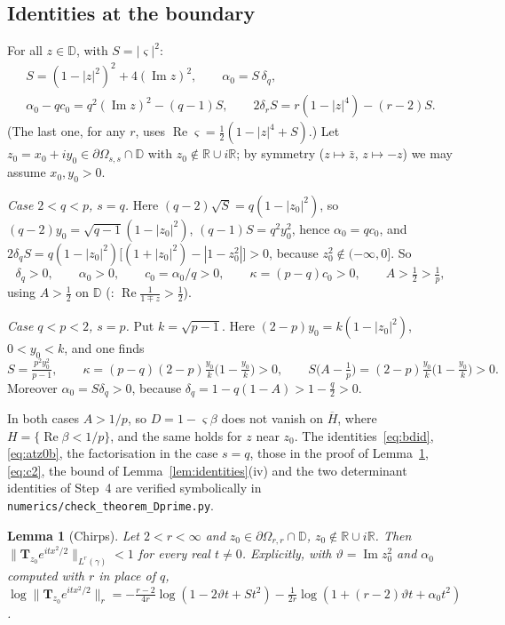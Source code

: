 \documentclass[11pt]{amsart}
\newtheorem{lemma}[theorem]{Lemma}
\theoremstyle{definition}
\newcommand{\R}{\mathbb{R}}
\newcommand{\Rea}{\operatorname{Re}}
\newcommand{\Ima}{\operatorname{Im}}
\newcommand{\bT}{\mathbf{T}}
\newcommand{\D}{\mathbb{D}}
\begin{document}
\subsection{Identities at the boundary}
For all $z\in\D$, with $S=|\varsigma|^2$:
\begin{equation}\label{eq:bdid}
\begin{gathered}
S=(1-|z|^2)^2+4(\Ima z)^2,\qquad \alpha_0=S\,\delta_q,\\
\alpha_0-qc_0=q^2(\Ima z)^2-(q-1)S,\qquad 2\delta_rS=r(1-|z|^4)-(r-2)S .
\end{gathered}
\end{equation}
(The last one, for any $r$, uses $\Rea\varsigma=\frac12(1-|z|^4+S)$.) Let $z_0=x_0+iy_0\in\partial\Omega_{s,s}\cap\D$
with $z_0\notin\R\cup i\R$; by symmetry ($z\mapsto\bar z$, $z\mapsto-z$) we may assume $x_0,y_0>0$.

\emph{Case $2<q<p$, $s=q$.} Here $(q-2)\sqrt S=q(1-|z_0|^2)$, so $(q-2)y_0=\sqrt{q-1}(1-|z_0|^2)$, $(q-1)S=q^2y_0^2$,
hence $\alpha_0=qc_0$, and $2\delta_qS=q(1-|z_0|^2)\big[(1+|z_0|^2)-|1-z_0^2|\big]>0$, because $z_0^2\notin(-\infty,0]$.
So
\begin{equation}\label{eq:atz0}
\delta_q>0,\qquad \alpha_0>0,\qquad c_0=\alpha_0/q>0,\qquad \kappa=(p-q)c_0>0,\qquad A>\tfrac12>\tfrac1p,
\end{equation}
using $A>\frac12$ on $\D$ (\cite[\S2]{DCH}: $\Rea\frac1{1\mp z}>\frac12$).

\emph{Case $q<p<2$, $s=p$.} Put $k=\sqrt{p-1}$. Here $(2-p)y_0=k(1-|z_0|^2)$, $0<y_0<k$, and one finds
\begin{equation}\label{eq:atz0b}
S=\tfrac{p^2y_0^2}{p-1},\qquad \kappa=(p-q)(2-p)\tfrac{y_0}k\big(1-\tfrac{y_0}k\big)>0,\qquad
S\big(A-\tfrac1p\big)=(2-p)\tfrac{y_0}k\big(1-\tfrac{y_0}k\big)>0 .
\end{equation}
Moreover $\alpha_0=S\delta_q>0$, because $\delta_q=1-q(1-A)>1-\frac q2>0$.

In both cases $A>1/p$, so $D=1-\varsigma\beta$ does not vanish on $\overline H$, where $H=\{\Rea\beta<1/p\}$, and the
same holds for $z$ near $z_0$. The identities~\eqref{eq:bdid}, \eqref{eq:atz0b}, the factorisation in the case
$s=q$, those in the proof of Lemma~\ref{lem:chirp}, \eqref{eq:c2}, the bound of Lemma~\ref{lem:identities}(iv) and
the two determinant identities of Step~4 are verified symbolically in
\texttt{numerics/\allowbreak check\_theorem\_Dprime.py}.

\begin{lemma}[Chirps]\label{lem:chirp}
Let $2<r<\infty$ and $z_0\in\partial\Omega_{r,r}\cap\D$, $z_0\notin\R\cup i\R$. Then
$\|\bT_{z_0}e^{itx^2/2}\|_{L^r(\gamma)}<1$ for every real $t\ne0$. Explicitly, with $\vartheta=\Ima z_0^2$ and
$\alpha_0$ computed with $r$ in place of $q$,
$\log\|\bT_{z_0}e^{itx^2/2}\|_r=-\frac{r-2}{4r}\log(1-2\vartheta t+St^2)-\frac1{2r}\log(1+(r-2)\vartheta t+\alpha_0t^2)$.
\end{lemma}
\end{document}
